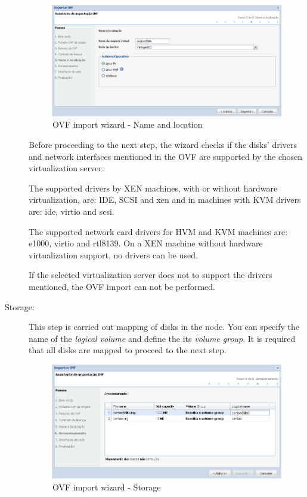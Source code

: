 \begin{description}
        \begin{figure}[H]
            \begin{center}
            \includegraphics[scale=0.5]{screenshots/ovf_import_name.png}
            \caption{OVF import wizard - Name and location}
            \label{fig:ovf_import_name}
            \end{center}
        \end{figure}
        Before proceeding to the next step, the wizard checks if the disks' drivers and network interfaces mentioned in the OVF are supported by the chosen virtualization server.

        The supported drivers by XEN machines, with or without hardware virtualization, are: IDE, SCSI and xen and in machines with KVM drivers are: ide, virtio and scsi.

        The supported network card drivers for HVM and KVM machines are: e1000, virtio and rtl8139. On a XEN machine without hardware virtualization support, no drivers can be used.

        If the selected virtualization server does not to support the drivers mentioned, the OVF import can not be performed.


    \item[Storage:] This step is carried out mapping of disks in the node. You can specify the name of the \emph{logical volume} and define the its \emph{volume group}.
         It is required that all disks are mapped to proceed to the next step.        
		\begin{figure}[H]
            \begin{center}
            \includegraphics[scale=0.5]{screenshots/ovf_import_storage.png}
            \caption{OVF import wizard - Storage}
            \label{fig:ovf_import_storage}
            \end{center}
        \end{figure}    


\end{description}
